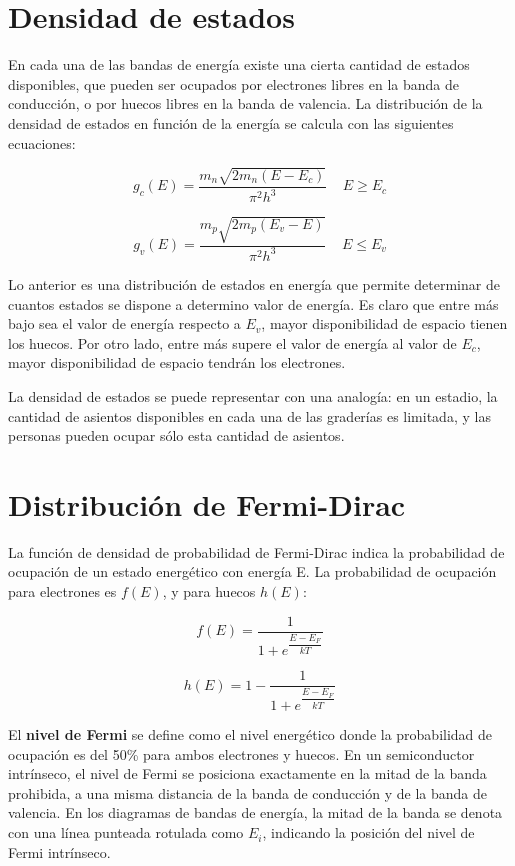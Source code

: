 \newpage
\section{Densidad de estados}

En cada una de las bandas de energía existe una cierta cantidad de estados disponibles, que pueden ser ocupados por electrones libres en la banda de conducción, o por huecos libres en la banda de valencia. La distribución de la densidad de estados en función de la energía se calcula con las siguientes ecuaciones:

\[ g_c(E) = \dfrac{m_n \sqrt{2m_n (E-E_c)}}{\pi^2 h^3}\ \ \ \ \ E \geq E_c \]

\[ g_v(E) = \dfrac{m_p \sqrt{2m_p (E_v-E)}}{\pi^2 h^3}\ \ \ \ \ E \leq E_v \]

Lo anterior es una distribución de estados en energía que permite determinar de cuantos estados se dispone a determino valor de energía. Es claro que entre más bajo sea el valor de energía respecto a $E_{v}$, mayor disponibilidad de espacio tienen los huecos. Por otro lado, entre más supere el valor de energía al valor de $E_{c}$, mayor disponibilidad de espacio tendrán los electrones.

La densidad de estados se puede representar con una analogía: en un estadio, la cantidad de asientos disponibles en cada una de las graderías es limitada, y las personas pueden ocupar sólo esta cantidad de asientos. 

\section{Distribución de Fermi-Dirac}

La función de densidad de probabilidad de Fermi-Dirac indica la probabilidad de ocupación de un estado energético con energía E. La probabilidad de ocupación para electrones es $f(E)$, y para huecos $h(E)$:

\[ f(E) = \dfrac{1}{1 + e^{\dfrac{E-E_F}{kT}}} \]

\[ h(E) = 1 - \dfrac{1}{1 + e^{\dfrac{E-E_F}{kT}}} \]

El \textbf{nivel de Fermi} se define como el nivel energético donde la probabilidad de ocupación es del 50\% para ambos electrones y huecos. En un semiconductor intrínseco, el nivel de Fermi se posiciona exactamente en la mitad de la banda prohibida, a una misma distancia de la banda de conducción y de la banda de valencia. En los diagramas de bandas de energía, la mitad de la banda se denota con una línea punteada rotulada como $E_i$, indicando la posición del nivel de Fermi intrínseco.

